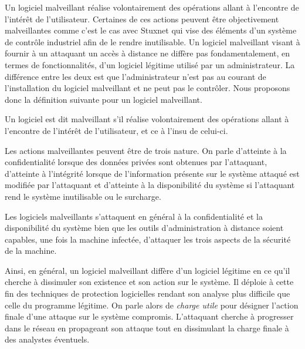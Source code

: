 
Un logiciel malveillant réalise volontairement des opérations allant à l'encontre de l'intérêt de l'utilisateur. 
Certaines de ces actions peuvent être objectivement malveillantes comme c'est le cas avec Stuxnet qui vise des éléments d'un système de contrôle industriel afin de le rendre inutilisable. 
Un logiciel malveillant visant à fournir à un attaquant un accès à distance ne diffère pas fondamentalement, en termes de fonctionnalités, d'un logiciel légitime utilisé par un administrateur.
La différence entre les deux est que l'administrateur n'est pas au courant de l'installation du logiciel malveillant et ne peut pas le contrôler.
Nous proposons donc la définition suivante pour un logiciel malveillant.
\begin{defi}
Un logiciel est dit malveillant s'il réalise volontairement des opérations allant à l'encontre de l'intérêt de l'utilisateur, et ce à l'insu de celui-ci.
\end{defi}

Les actions malveillantes peuvent être de trois nature. On parle d'atteinte à la confidentialité lorsque des données privées sont obtenues par l'attaquant, d'atteinte à l'intégrité lorsque de l'information présente sur le système attaqué est modifiée par l'attaquant et d'atteinte à la disponibilité du système si l'attaquant rend le système inutilisable ou le surcharge.

Les logiciels malveillants s'attaquent en général à la confidentialité et la disponibilité du système bien que les outils d'administration à distance soient capables, une fois la machine infectée, d'attaquer les trois aspects de la sécurité de la machine.

Ainsi, en général, un logiciel malveillant diffère d'un logiciel légitime en ce qu'il cherche à dissimuler son existence et son action sur le système. Il déploie à cette fin des techniques de protection logicielles rendant son analyse plus difficile que celle du programme légitime.
On parle alors de \emph{charge utile} pour désigner l'action finale d'une attaque sur le système compromis. L'attaquant cherche à progresser dans le réseau en propageant son attaque tout en dissimulant la charge finale à des analystes éventuels.


